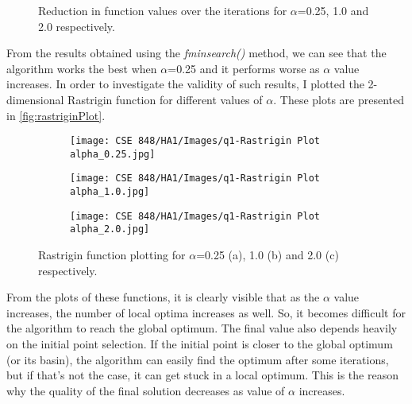 \documentclass{article}
\begin{document}
\begin{figure}[H]
    \centering
    \caption{Reduction in function values over the iterations for $\alpha$=0.25, 1.0 and 2.0 respectively.}
    \label{fig:UncOptimizationPlot}
\end{figure}

From the results obtained using the \textit{fminsearch()} method, we can see that the algorithm works the best when $\alpha$=0.25 and it performs worse as $\alpha$ value increases. In order to investigate the validity of such results, I plotted the 2-dimensional Rastrigin function for different values of $\alpha$. These plots are presented in \autoref{fig:rastriginPlot}.\\ 

\begin{figure}[H]
    \centering
    \begin{subfigure}{0.4\textwidth}
        \texttt{[image: CSE 848/HA1/Images/q1-Rastrigin Plot alpha\_0.25.jpg]}
        \caption{}
    \end{subfigure}
    \hfill
    \begin{subfigure}{0.4\textwidth}
        \texttt{[image: CSE 848/HA1/Images/q1-Rastrigin Plot alpha\_1.0.jpg]}
        \caption{}
    \end{subfigure}
    \hfill
    \begin{subfigure}{0.4\textwidth}
        \texttt{[image: CSE 848/HA1/Images/q1-Rastrigin Plot alpha\_2.0.jpg]} 
        \caption{}
    \end{subfigure}
    \caption{Rastrigin function plotting for $\alpha$=0.25 (a), 1.0 (b) and 2.0 (c)  respectively.}
    \label{fig:rastriginPlot}
\end{figure}

From the plots of these functions, it is clearly visible that as the $\alpha$ value increases, the number of local optima increases as well. So, it becomes difficult for the algorithm to reach the global optimum. The final value also depends heavily on the initial point selection. If the initial point is closer to the global optimum (or its basin), the algorithm can easily find the optimum after some iterations, but if that's not the case, it can get stuck in a local optimum. This is the reason why the quality of the final solution decreases as value of $\alpha$ increases.
\end{document}
